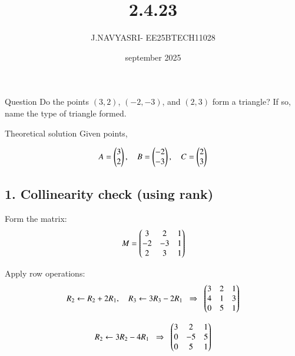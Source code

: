 \documentclass{beamer}
\title %
{2.4.23}
\date{september 2025}
\author %
{J.NAVYASRI- EE25BTECH11028}
\begin{document}
\frame{\titlepage}
\begin{frame}{Question}
Do the points \( (3, 2) \), \( (-2, -3) \), and \( (2, 3) \) form a triangle? If so, name the type of triangle formed.
\end{frame}

\begin{frame}{Theoretical solution}
Given points,

\begin{equation}
A=\begin{pmatrix}3\\2\end{pmatrix}, \quad 
B=\begin{pmatrix}-2\\-3\end{pmatrix}, \quad 
C=\begin{pmatrix}2\\3\end{pmatrix}
\end{equation}

\subsection*{1. Collinearity check (using rank)}

Form the matrix:
\begin{equation}
M=\begin{pmatrix}
3 & 2 & 1\\
-2 & -3 & 1\\
2 & 3 & 1
\end{pmatrix}
\end{equation}

Apply row operations:
\begin{equation}
R_2 \leftarrow R_2+2R_1,\quad R_3 \leftarrow 3R_3-2R_1
\;\;\Rightarrow\;\;
\begin{pmatrix}
3 & 2 & 1\\
4 & 1 & 3\\
0 & 5 & 1
\end{pmatrix}
\end{equation}

\begin{equation}
R_2 \leftarrow 3R_2-4R_1
\;\;\Rightarrow\;\;
\begin{pmatrix}
3 & 2 & 1\\
0 & -5 & 5\\
0 & 5 & 1
\end{pmatrix}
\end{equation}
\end{frame}
\end{document}
